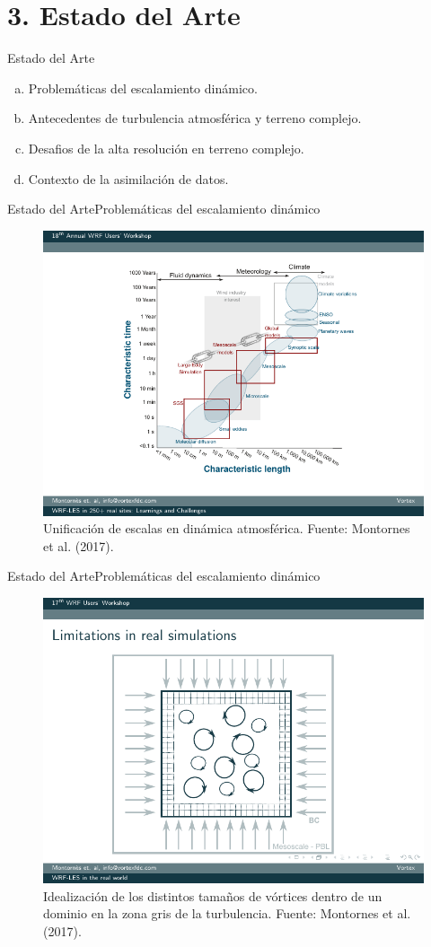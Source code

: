 \documentclass[mathserif,10pt]{beamer}
\begin{document}
\section{3. Estado del Arte}
\begin{frame}{Estado del Arte}
	\begin{enumerate}[a.]
		\item Problemáticas del escalamiento dinámico.
		\item Antecedentes de turbulencia atmosférica y terreno complejo.
		\item Desafios de la alta resolución en terreno complejo.
		\item Contexto de la asimilación de datos.
	\end{enumerate}
\end{frame}

\begin{frame}{Estado del Arte}{Problemáticas del escalamiento dinámico}
	\begin{figure}
		\centering
		\includegraphics[width=0.7\linewidth,trim={2.6cm 1.4cm 1.5cm 0.8cm},clip]{fig/02/escalas}
		\vspace{-2mm}
		\caption{Unificación de escalas en dinámica atmosférica. Fuente: Montornes et al. (2017).}
	\end{figure}
\end{frame}

\begin{frame}{Estado del Arte}{Problemáticas del escalamiento dinámico}
	\begin{figure}
		\centering
		\includegraphics[width=0.6\linewidth,trim={2.67cm 1.35cm 3.1cm 2.25cm},clip]{fig/02/grid}
		\caption{Idealización de los distintos tamaños de vórtices dentro de un dominio en la zona gris de la turbulencia. Fuente: Montornes et al. (2017).}
		\label{fig:02_grid_vortex}
	\end{figure}
\end{frame}
\end{document}
